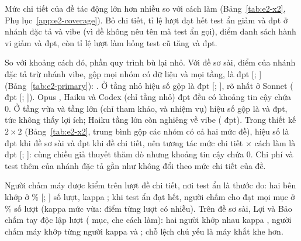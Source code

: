 Mức chi tiết của đề tác động lớn hơn nhiều so với cách làm (Bảng~\ref{tab:e2-x2}, Phụ lục~\ref{app:e2-coverage}). Bỏ chi tiết, tỉ lệ
lượt đạt hết test ẩn giảm \NumETwoXPassShiftSpec{} và \NumETwoXPassShiftVibe{} đpt ở nhánh đặc tả và vibe (vì đề không nêu tên mà test ẩn gọi), điểm danh sách hành vi giảm \NumETwoXScoreShiftSpec{} và \NumETwoXScoreShiftVibe{} đpt, còn tỉ lệ
lượt làm hỏng test cũ tăng \NumETwoXRegressionShiftSpec{} và \NumETwoXRegressionShiftVibe{} đpt.

So với khoảng cách đó, phần quy trình bù lại nhỏ. Với đề sơ sài, điểm của nhánh đặc tả trừ nhánh vibe,
gộp mọi nhóm có dữ liệu và mọi tầng, là \NumETwoPooledAllPp{} đpt [\NumETwoPooledAllLowPp{};
\NumETwoPooledAllHighPp{}] (Bảng~\ref{tab:e2-primary}): \NumETwoReading{}. Ở tầng nhỏ hiệu số gộp là
\NumETwoPooledSmallPp{} đpt [\NumETwoPooledSmallLowPp{}; \NumETwoPooledSmallHighPp{}], rõ nhất ở Sonnet
(\NumETwoSonnetSmallPp{} đpt [\NumETwoSonnetSmallLowPp{}; \NumETwoSonnetSmallHighPp{}]). Opus \NumETwoOpusAllPp{},
Haiku \NumETwoHaikuAllPp{} và Codex (chỉ tầng nhỏ) \NumETwoCodexAllPp{} đpt đều có khoảng tin cậy chứa 0. Ở
tầng vừa và tầng lớn (chỉ tham khảo, \NumMediumTasks{} và \NumFeatureTasks{} nhiệm vụ) hiệu số gộp là
\NumETwoPooledMediumRefPp{} và \NumETwoPooledLargeRefPp{} đpt, tức không thấy lợi ích; Haiku tầng lớn còn
nghiêng về vibe (\NumETwoHaikuLargeRefPp{} đpt). Trong thiết kế $2\times2$ (Bảng~\ref{tab:e2-x2}, trung bình gộp các nhóm có cả hai mức đề), hiệu số là
\NumETwoXScoreBrief{} đpt khi đề sơ sài và \NumETwoXScoreDetailed{} đpt khi đề chi tiết, nên tương tác mức chi tiết $\times$ cách làm là
\NumETwoXScoreInter{} đpt [\NumETwoXScoreInterLow{}; \NumETwoXScoreInterHigh{}]: cùng chiều giả thuyết
thăm dò nhưng khoảng tin cậy chứa 0. Chi phí và test
thêm của nhánh đặc tả gần như không đổi theo mức chi tiết của đề.

\begin{table}[H]
\centering\footnotesize
\caption{E2: điểm danh sách hành vi với đề sơ sài, đặc tả trừ vibe
(đpt, KTC 95\%); trong ngoặc: chỉ tham khảo (dưới sáu nhiệm vụ); ``--'': không chạy}
\label{tab:e2-primary}

\end{table}


Người chấm máy được kiểm trên \NumETwoJudgeN{} lượt đề chi tiết, nơi test ẩn là thước đo: hai bên khớp ở
\NumETwoJudgeAgreePct{}\% [\NumETwoJudgeAgreeLowPct{}; \NumETwoJudgeAgreeHighPct{}] số lượt, kappa
\NumETwoJudgeKappa{}; khi test ẩn đạt hết, người chấm cho đạt mọi mục ở \NumETwoJudgeAllMetGivenPassPct{}\%
số lượt (kappa mức vừa: điểm từng lượt có nhiễu). Trên đề sơ sài, Lợi và Bảo chấm tay độc lập \NumETwoHumanUnits{} lượt (\NumETwoHumanItems{} mục, che cách
làm): hai người khớp nhau kappa \NumETwoHumanLoiBaoKappa{}, người chấm máy khớp từng người kappa
\NumETwoHumanLoiJudgeKappa{} và \NumETwoHumanBaoJudgeKappa{}; chỗ lệch chủ yếu là máy khắt khe hơn.

